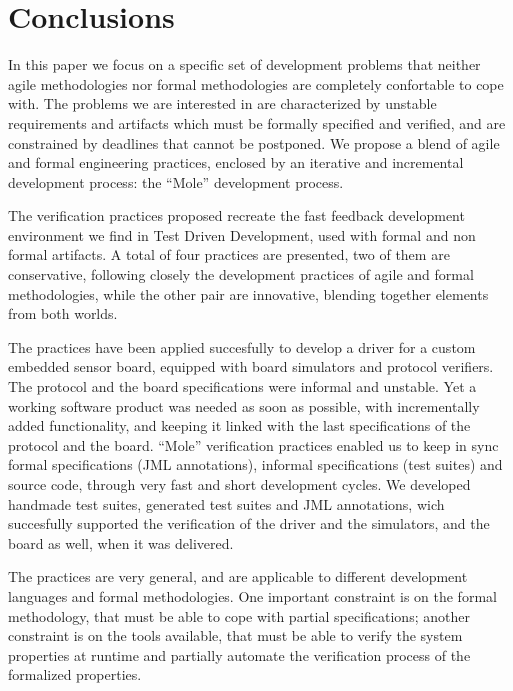 \documentclass{article}
\begin{document}
\section{Conclusions}
\label{sec:conclusions}

In this paper we focus on a specific set of development problems that neither agile methodologies nor formal methodologies are completely confortable to cope with.
The problems we are interested in are characterized by unstable requirements and artifacts which must be formally specified and verified, and are constrained by deadlines that cannot be postponed.
We propose a blend of agile and formal engineering practices, enclosed by an iterative and incremental development process: the ``Mole'' development process.

The verification practices proposed recreate the fast feedback development environment we find in Test Driven Development, used with formal and non formal artifacts.
A total of four practices are presented, two of them are conservative, following closely the development practices of agile and formal methodologies, while the other pair are innovative, blending together elements from both worlds.

The practices have been applied succesfully to develop a driver for a custom embedded sensor board, equipped with board simulators and protocol verifiers. 
The protocol and the board specifications were informal and unstable. 
Yet a working software product was needed as soon as possible, with incrementally added functionality, and keeping it linked with the last specifications of the protocol and the board.
``Mole'' verification practices enabled us to keep in sync formal specifications (JML annotations), informal specifications (test suites) and source code, through very fast and short development cycles.
We developed handmade test suites, generated test suites and JML annotations, wich succesfully supported the verification of the driver and the simulators, and the board as well, when it was delivered.

The practices are very general, and are applicable to different development languages and formal methodologies.
One important constraint is on the formal methodology, that must be able to cope with partial specifications; another constraint is on the tools available, that must be able to verify the system properties at runtime and partially automate the verification process of the formalized properties.




\end{document}
